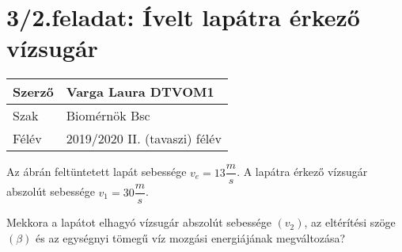 \section*{3/2.feladat: Ívelt lapátra érkező vízsugár}
\begin{tabular}{ | p{2cm} | p{14cm} | } 
	\hline
	Szerző & Varga Laura DTVOM1 \\ 
	\hline
	Szak &Biomérnök Bsc \\ 
	\hline
	Félév & 2019/2020 II. (tavaszi) félév \\ 
	\hline
\end{tabular}
\vspace{0.5cm}
\noindent

Az ábrán feltüntetett lapát sebessége $v_e= 13 \dfrac{m}{s}$. A lapátra érkező vízsugár abszolút sebessége $v_1= 30 \dfrac{m}{s}$.

Mekkora a lapátot elhagyó vízsugár abszolút sebessége $(v_2)$, az eltérítési szöge $(\beta)$ és az egységnyi tömegű víz mozgási energiájának megváltozása?

